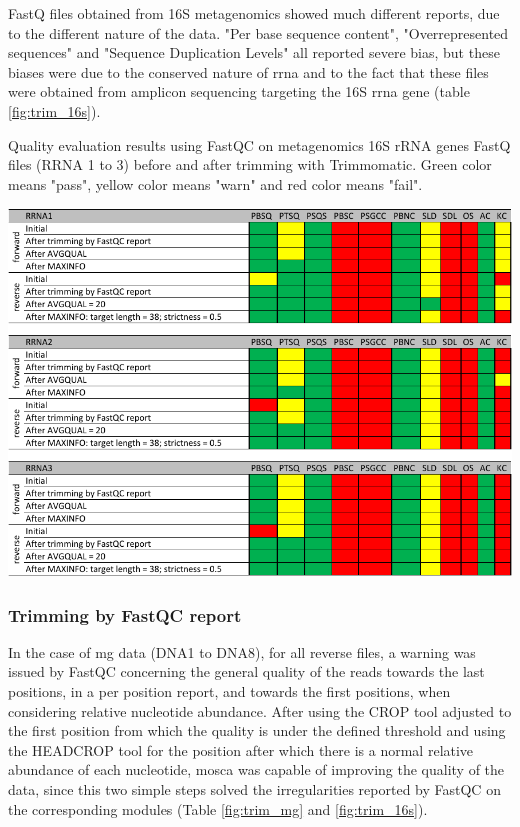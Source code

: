 \documentclass[
  oneside,
  11pt, a4paper,
  footinclude=true,
  headinclude=true,
  cleardoublepage=empty
]{scrbook}
\begin{document}
    FastQ files obtained from 16S metagenomics showed much different reports, due to the different nature of the data. "Per base sequence content", "Overrepresented sequences" and "Sequence Duplication Levels" all reported severe bias, but these biases were due to the conserved nature of \gls{rrna} and to the fact that these files were obtained from amplicon sequencing targeting the 16S \gls{rrna} gene (table \ref{fig:trim_16s}).
    
    \begin{table}[ph!]    
    \caption{Quality evaluation results using FastQC on metagenomics 16S rRNA genes FastQ files (RRNA 1 to 3) before and after trimming with Trimmomatic. Green color means "pass", yellow color means "warn" and red color means "fail".}
    \includegraphics[width=\columnwidth,height=\textheight/2]{FiguresUndTables/Results/Preprocessing/fastqcrrna.pdf}
    \label{fig:trim_16s}
    \end{table}
    
    \subsubsection{Trimming by FastQC report}
    
    In the case of \gls{mg} data (DNA1 to DNA8), for all reverse files, a warning was issued by FastQC concerning the general quality of the reads towards the last positions, in a per position report, and towards the first positions, when considering relative nucleotide abundance. After using the CROP tool adjusted to the first position from which the quality is under the defined threshold and using the HEADCROP tool for the position after which there is a normal relative abundance of each nucleotide, \gls{mosca} was capable of improving the quality of the data, since this two simple steps solved the irregularities reported by FastQC on the corresponding modules (Table \ref{fig:trim_mg} and \ref{fig:trim_16s}).
    
\end{document}
